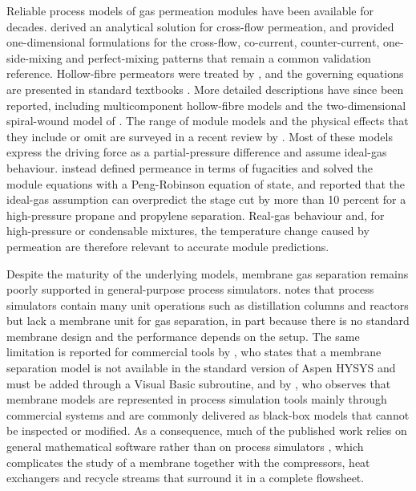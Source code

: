 \documentclass[a4paper,fleqn]{cas-dc}
\begin{document}
Reliable process models of gas permeation modules have been available for
decades. \citet{weller1950} derived an analytical solution for cross-flow
permeation, and \citet{shindo1985} provided one-dimensional formulations for
the cross-flow, co-current, counter-current, one-side-mixing and
perfect-mixing patterns that remain a common validation reference. Hollow-fibre
permeators were treated by \citet{pan1986}, and the governing equations are
presented in standard textbooks \citep{geankoplis}. More detailed descriptions
have since been reported, including multicomponent hollow-fibre models
\citep{coker1998} and the two-dimensional spiral-wound model of
\citet{diaspinto2020}. The range of module models and the physical effects that
they include or omit are surveyed in a recent review by \citet{daconceicao2023}.
Most of these models express the driving force as a partial-pressure difference
and assume ideal-gas behaviour. \citet{dejaco2020} instead defined permeance in
terms of fugacities and solved the module equations with a Peng-Robinson
equation of state, and reported that the ideal-gas assumption can overpredict
the stage cut by more than 10 percent for a high-pressure propane and propylene separation. Real-gas behaviour
and, for high-pressure or condensable mixtures, the temperature change caused by
permeation \citep{fontoura2022} are therefore relevant to accurate module
predictions.

Despite the maturity of the underlying models, membrane gas separation remains
poorly supported in general-purpose process simulators. \citet{alqaheem2024accuracy}
notes that process simulators contain many unit operations such as distillation
columns and reactors but lack a membrane unit for gas separation, in part
because there is no standard membrane design and the performance depends on the setup. The same limitation is
reported for commercial tools by \citet{ahmad2012}, who states that a membrane
separation model is not available in the standard version of Aspen HYSYS and
must be added through a Visual Basic subroutine, and by
\citet{aziaba2022}, who observes that membrane models are represented in process
simulation tools mainly through commercial systems and are commonly delivered as
black-box models that cannot be inspected or modified. As a consequence, much of
the published work relies on general mathematical software rather than on process
simulators \citep{alqaheem2024accuracy}, which complicates the study of a
membrane together with the compressors, heat exchangers and recycle streams that
surround it in a complete flowsheet.
\end{document}
